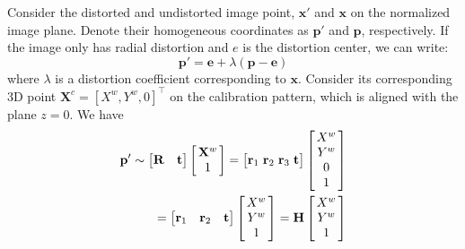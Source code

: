 \documentclass{report}
\begin{document}
Consider the distorted and undistorted image point, $\mathbf{x}'$ and $\mathbf{x}$ on the normalized image plane. Denote their homogeneous coordinates as $\mathbf{p}'$ and $\mathbf{p}$, respectively. If the image only has radial distortion and $e$ is the distortion center, we can write:
\begin{equation}
\mathbf{p}' = \mathbf{e} + \lambda (\mathbf{p} - \mathbf{e})
\end{equation}
where $\lambda$ is a distortion coefficient corresponding to $\mathbf{x}$. Consider its corresponding 3D point $\mathbf{X}^c = [X^w, Y^w, 0]^\top$ on the calibration pattern, which is aligned with the plane $z = 0$. We have
\begin{equation}
\begin{split}
\mathbf{p}' \sim 
\begin{bmatrix}
\mathbf{R} & \mathbf{t}
\end{bmatrix}
\arraycolsep=1.5pt%
\begin{bmatrix}
	\begin{array}{c}
	\mathbf{X}^w \\ 1
	\end{array}
\end{bmatrix}
= 
\begin{bmatrix}
\mathbf{r}_1 & \mathbf{r}_2 & \mathbf{r}_3 & \mathbf{t}
\end{bmatrix}
\arraycolsep=1.5pt%
\begin{bmatrix}
	\begin{array}{c}
	X^w \\ Y^w \\ 0 \\ 1
	\end{array}
\end{bmatrix}\\
= 
\begin{bmatrix}
\mathbf{r}_1 & \mathbf{r}_2 & \mathbf{t}
\end{bmatrix}
\arraycolsep=1.5pt%
\begin{bmatrix}
	\begin{array}{c}
	X^w \\ Y^w \\ 1
	\end{array}
\end{bmatrix}
=\mathbf{H}
\arraycolsep=1.5pt%
\begin{bmatrix}
	\begin{array}{c}
	X^w \\ Y^w \\ 1
	\end{array}
\end{bmatrix}
\end{split}
\end{equation}
\end{document}
